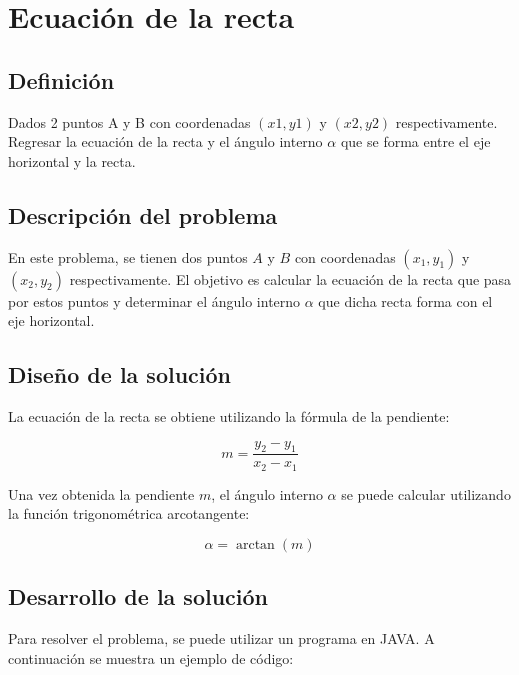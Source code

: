
\section{Ecuación de la recta}
\subsection{Definición}
Dados 2 puntos A y B con coordenadas $(x1, y1)$ y
$(x2, y2)$ respectivamente. Regresar la ecuación de la recta y el ángulo interno $\alpha$ que se forma entre el eje horizontal y la recta.

\subsection{Descripción del problema}

En este problema, se tienen dos puntos $A$ y $B$ con coordenadas $(x_1, y_1)$ y $(x_2, y_2)$ respectivamente. El objetivo es calcular la ecuación de la recta que pasa por estos puntos y determinar el ángulo interno $\alpha$ que dicha recta forma con el eje horizontal.

\subsection{Diseño de la solución}

La ecuación de la recta se obtiene utilizando la fórmula de la pendiente:

\begin{equation}
m = \frac{y_2 - y_1}{x_2 - x_1}
\end{equation}

Una vez obtenida la pendiente $m$, el ángulo interno $\alpha$ se puede calcular utilizando la función trigonométrica arcotangente:

\begin{equation}
\alpha = \arctan(m)
\end{equation}

\subsection{Desarrollo de la solución}

Para resolver el problema, se puede utilizar un programa en JAVA. A continuación se muestra un ejemplo de código:

